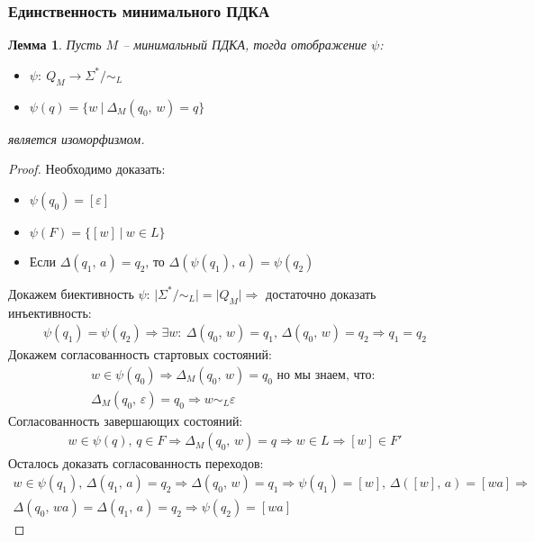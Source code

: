 \documentclass[a4paper,12pt]{article}
\theoremstyle{plain}
\newtheorem{lemma}{Лемма}[subsection]
\theoremstyle{definition}
\theoremstyle{remark}
\begin{document}
\subsubsection*{Единственность минимального ПДКА}
\begin{lemma}
	Пусть $M$ -- минимальный ПДКА, тогда отображение $\psi$:
	\begin{itemize}
		\item $\psi:\: Q_M \to \Sigma^*/\sim_L$
		\item $\psi(q) = \{w \:|\: \Delta_M(q_0,\, w) = q\}$
	\end{itemize}
	является изоморфизмом.
\end{lemma}

\begin{proof}
	Необходимо доказать:
	\begin{itemize}
		\item $\psi(q_0) = [\varepsilon]$
		\item $\psi(F) = \{[w] \:|\: w \in L\}$
		\item Если $\Delta(q_1,\,a) = q_2$, то $\Delta(\psi(q_1),\, a) = \psi(q_2)$
	\end{itemize}

	Докажем биективность $\psi$: $\vert\Sigma^*/\sim_L\vert = \vert Q_M\vert \Rightarrow$ достаточно доказать инъективность:
	\begin{align*}
		\psi(q_1) = \psi(q_2) \Rightarrow \exists w :\: \Delta(q_0,\,w) = q_1,\, \Delta(q_0,\, w) = q_2 \Rightarrow q_1 = q_2
	\end{align*}
	Докажем согласованность стартовых состояний:
	\begin{align*}
		w \in \psi(q_0) \Rightarrow \Delta_M(q_0,\, w) = q_0 \text{ но мы знаем, что: } \\
		\Delta_M(q_0,\, \varepsilon) = q_0 \Rightarrow w \sim_L \varepsilon
	\end{align*}
	Согласованность завершающих состояний:
	\begin{align*}
		w \in \psi(q),\, q \in F \Rightarrow \Delta_M(q_0,\, w) = q \Rightarrow w \in L \Rightarrow [w] \in F'
	\end{align*}
	Осталось доказать согласованность переходов:
	\begin{align*}
		w \in \psi(q_1),\, \Delta(q_1,\,a) = q_2 \Rightarrow \Delta(q_0,\, w) = q_1 \Rightarrow \psi(q_1) = [w],\, \Delta([w],\, a) = [wa] \Rightarrow \\
		\Delta(q_0,\, wa) = \Delta(q_1,\,a) = q_2 \Rightarrow \psi(q_2) = [wa]
	\end{align*}
\end{proof}
\end{document}
